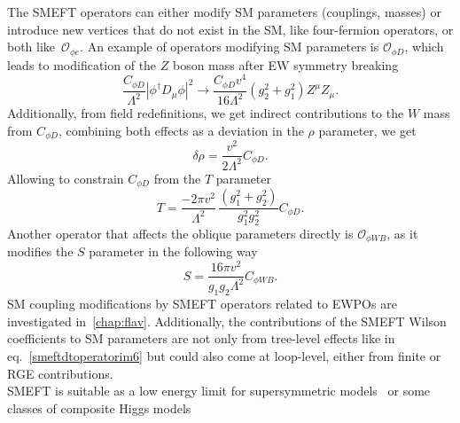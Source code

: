 The SMEFT operators can either modify SM parameters (couplings, masses) or introduce new vertices that do not exist in the SM, like four-fermion operators, or both like~$\mathcal{O}_{\phi e}$. An example of operators modifying SM parameters is $ \mathcal O_{\phi D}$, which leads to modification of the $Z$ boson mass after EW symmetry breaking 
\begin{equation}
	\frac{C_{\phi D}}{\Lambda^2} | \phi^\dagger D_\mu \phi |^2 \to \frac{C_{\phi D} v^4}{16 \Lambda^2 } (g_2^2+g_1^2) Z^\mu Z_\mu.
	\label{smeftdtoperatorim6}
\end{equation}
Additionally, from field redefinitions, we get indirect contributions to the $W$ mass from $C_{\phi D}$, combining both effects as a deviation in the $\rho$ parameter, we get
\begin{equation}
	\delta \rho = \frac{v^2}{2 \Lambda^2} C_{\phi D}.
	\label{rhosmeft}
\end{equation}
Allowing to constrain $C_{\phi D}$ from the $T$ parameter 
\begin{equation}
	T = \frac{-2 \pi v^2}{\Lambda^2} \, \frac{(g_1^2 +g_2^2)}{g_1^2g_2^2} C_{\phi D}.
	\label{smeftT}
\end{equation}
Another operator that affects the oblique parameters directly is $\mathcal{O}_{\phi W B}$, as it modifies the $S$ parameter in the following way
\begin{equation}
	S =\frac{16 \pi v^2}{g_1 g_2 \Lambda^2} C_{\phi W B}.
	\label{smeftS}
\end{equation}
SM coupling modifications by SMEFT operators related to EWPOs are investigated in~\autoref{chap:flav}. Additionally, the contributions of the SMEFT Wilson coefficients to SM parameters are not only from tree-level effects like in eq.~\eqref{smeftdtoperatorim6} but could also come at loop-level, either from finite or RGE contributions.\\
SMEFT is suitable as a low energy limit for supersymmetric models~\cite{CARENA200363} or some classes of composite Higgs models~\cite{Contino:2010rs,Panico:2015jxa}
